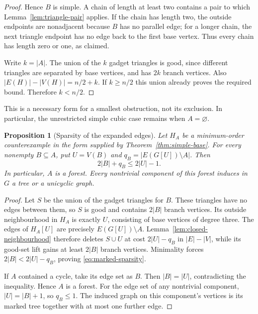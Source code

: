 \documentclass[11pt]{article}
\newtheorem{proposition}[theorem]{Proposition}
\begin{document}
\begin{proof}
Hence $B$ is simple. A chain of length at least two contains a pair
to which Lemma~\ref{lem:triangle-pair} applies. If the chain has
length two, the outside endpoints are nonadjacent because $B$ has
no parallel edge; for a longer chain, the next triangle endpoint
has no edge back to the first base vertex. Thus every chain has
length zero or one, as claimed.

Write $k=|A|$. The union of the $k$ gadget triangles is good, since
different triangles are separated by base vertices, and has $2k$
branch vertices. Also $|E(H)|-|V(H)|=n/2+k$. If $k\geq n/2$ this
union already proves the required bound. Therefore $k<n/2$.
\end{proof}

This is a necessary form for a smallest obstruction, not its
exclusion. In particular, the unrestricted simple cubic case
remains when $A=\varnothing$.

\begin{proposition}[Sparsity of the expanded edges]\label{prop:marked-sparsity}
Let $H_A$ be a minimum-order counterexample in the form supplied by
Theorem~\ref{thm:simple-base}. For every nonempty $B\subseteq A$,
put $U=V(B)$ and $q_B=|E(G[U])\setminus A|$. Then
\begin{equation}\label{eq:marked-sparsity}
 2|B|+q_B\leq2|U|-1.
\end{equation}
In particular, $A$ is a forest. Every nontrivial component of this
forest induces in $G$ a tree or a unicyclic graph.
\end{proposition}
\begin{proof}
Let $S$ be the union of the gadget triangles for $B$. These
triangles have no edges between them, so $S$ is good and contains
$2|B|$ branch vertices. Its outside neighbourhood in $H_A$ is
exactly $U$, consisting of base vertices of degree three.
The edges of $H_A[U]$ are precisely $E(G[U])\setminus A$.
Lemma~\ref{lem:closed-neighbourhood} therefore deletes $S\cup U$
at cost $2|U|-q_B$ in $|E|-|V|$, while its good-set lift gains
at least $2|B|$ branch vertices. Minimality forces
$2|B|<2|U|-q_B$, proving \eqref{eq:marked-sparsity}.

If $A$ contained a cycle, take its edge set as $B$. Then
$|B|=|U|$, contradicting the inequality. Hence $A$ is a forest.
For the edge set of any nontrivial component, $|U|=|B|+1$,
so $q_B\leq1$. The induced graph on this component's vertices
is its marked tree together with at most one further edge.
\end{proof}
\end{document}
